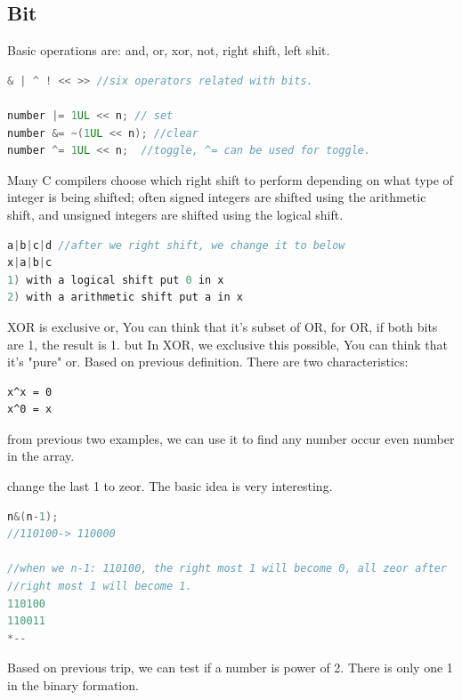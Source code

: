 \documentclass[a4paper,11pt,twoside]{book}
\begin{document}
\subsection{Bit}

	\par Basic operations are: and, or, xor, not, right shift, left shit. 
\begin{lstlisting}[frame=single, language=c++]	
& | ^ ! << >> //six operators related with bits.

number |= 1UL << n; // set
number &= ~(1UL << n); //clear
number ^= 1UL << n;  //toggle, ^= can be used for toggle. 
\end{lstlisting}

	\par Many C compilers choose which right shift to perform depending on what type of integer is being shifted; often signed integers are shifted using the arithmetic shift, and unsigned integers are shifted using the logical shift.
	
\begin{lstlisting}[frame=single, language=c++]	
a|b|c|d //after we right shift, we change it to below
x|a|b|c
1) with a logical shift put 0 in x
2) with a arithmetic shift put a in x
\end{lstlisting}	
	
	\par XOR is exclusive or, You can think that it's subset of OR, for OR, if both bits are 1, the result is 1. but In XOR, we exclusive this possible,  You can think that it's "pure" or.  Based on previous definition. There are two characteristics:
\begin{lstlisting}
x^x = 0
x^0 = x
\end{lstlisting}
	from previous two examples, we can use it to find any number occur even number in the array. 
		
	\par change the last 1 to zeor. The basic idea is very interesting. 
\begin{lstlisting}[frame=single, language=c++]	
n&(n-1);
//110100-> 110000

//when we n-1: 110100, the right most 1 will become 0, all zeor after 
//right most 1 will become 1. 
110100
110011
*--	
\end{lstlisting}	
	
	\par Based on previous trip, we can test if a number is power of 2. There is only one 1 in the binary formation.
	
\end{document}
